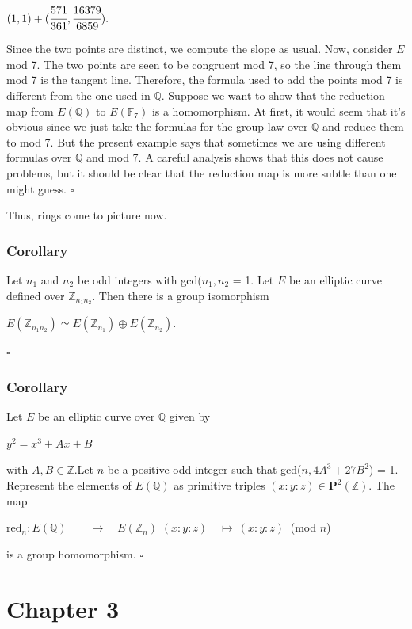 \documentclass[a4paper, 12pt]{article}
\begin{document}
\begin{center} $(1, 1) + (\cfrac{571}{361}, \cfrac{16379}{6859}).$ \end{center}
Since the two points are distinct, we compute the slope as usual. Now, consider $E$ mod 7. The two points are seen to be congruent mod 7, so the line through them mod 7 is the tangent line. Therefore, the formula used to add the points mod 7 is different from the one used in $\mathbb{Q}$. Suppose we want to show that the reduction map from $E(\mathbb{Q})$ to $E(\mathbb{F}_7)$ is a homomorphism. At first, it would seem that it's obvious since we just take the formulas for the group law over $\mathbb{Q}$ and reduce them to mod 7. But the present example says that sometimes we are using different formulas over $\mathbb{Q}$ and mod 7. A careful analysis shows that this does not cause problems, but it should be clear that the reduction map is more subtle than one might guess. $\square$ \par
Thus, rings come to picture now.
\subsubsection {Corollary}
Let $n_1$ and $n_2$ be odd integers with gcd($n_1,n_2$ = 1. Let $E$ be an elliptic curve defined over $\mathbb{Z}_{n_1n_2}$. Then there is a group isomorphism
\begin{center} $E(\mathbb{Z}_{n_1n_2}) \simeq E(\mathbb{Z}_{n_1}) \oplus E(\mathbb{Z}_{n_2}).$ \end{center}
$\square$
\subsubsection{Corollary}
Let $E$ be an elliptic curve over $\mathbb{Q}$ given by
\begin{center} $y^2=x^3+Ax+B$ \end{center}
with $A, B \in \mathbb{Z}$.\newline Let $n$ be a positive odd integer such that gcd($n, 4A^3+27B^2$) = 1. Represent the elements of $E(\mathbb{Q})$ as primitive triples $(x:y:z) \in \textbf{P}^2(\mathbb{Z})$. The map
\begin{center}
red$_n:E(\mathbb{Q}) \qquad \longrightarrow \quad E(\mathbb{Z}_n)$ \newline
$(x:y:z) \quad\mapsto \:(x:y:z) \:$ (mod $n$) 
\end{center}
is a group homomorphism. $\square$
\section {Chapter 3}
\end{document}
